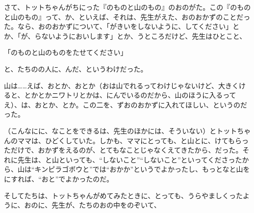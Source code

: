 さて、トットちゃんがちにった『のものと山のもの』のおのがた。この『のものと山のもの』って、か、といえば、それは、先生がえた、おのおかずのことだった。なら、おのおかずについて、「がきいをしないように、してください」とか、「が、らないようにおいします」とか、うところだけど、先生はひとこと、

「のものと山のものをたせてください」

と、たちのの人に、んだ、というわけだった。

山は……えば、おとか、おとか（おは山でれるってわけじゃないけど、大きくけると、とかとかニワトリとかは、にんでいるのだから、山のほうに入るってえ）、は、おとか、とか。この二を、ずおのおかずに入れてほしい、というのだった。

（こんなにに、なことをできるは、先生のほかには、そういない）とトットちゃんのママは、ひどくしていた。しかも、ママにとっても、と山とに、けてもらっただけで、おかずをえるのが、とてもなことじゃなくえてきたから、だった。それに先生は、と山といっても、“しないこと”“しないこと”といってくださったから、山は“キンピラゴボウと”では“おかか”というでよかったし、もっとなと山をにすれば、“おと”でよかったのだ。

そしてたちは、トットちゃんがめてみたときに、とっても、うらやましくったように、おのに、先生が、たちのおの中をのぞいて、

